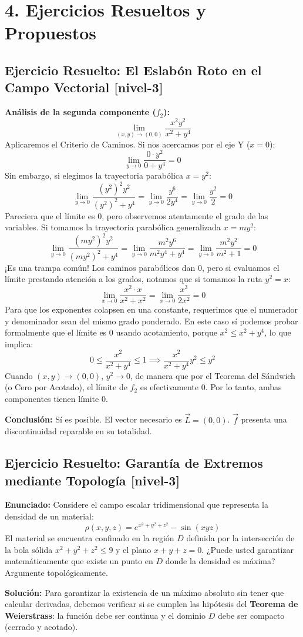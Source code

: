 \documentclass[11pt]{article}
\newenvironment{ejercicios}{%
  \section*{4. Ejercicios Resueltos y Propuestos}%
}{}
\newenvironment{ejercicioresuelto}[2]{\subsection*{Ejercicio Resuelto: #1 \small{[#2]}}}{}
\newcommand{\enunciado}[1]{\textbf{Enunciado:} #1\par\vspace{0.2cm}}
\newcommand{\solucion}[1]{\textbf{Solución:} #1\par\vspace{0.4cm}}
\begin{document}
\begin{ejercicios}
\begin{ejercicioresuelto}{El Eslabón Roto en el Campo Vectorial}{nivel-3}
{      \textbf{Análisis de la segunda componente ($f_2$):}
      $$ \displaystyle \lim\limits_{(x,y) \to (0,0)} \displaystyle \dfrac{x^2 y^2}{x^2 + y^4} $$
      Aplicaremos el Criterio de Caminos. 
      Si nos acercamos por el eje Y ($x = 0$):
      $$ \displaystyle \lim\limits_{y \to 0} \displaystyle \dfrac{0 \cdot y^2}{0 + y^4} = 0 $$
      Sin embargo, si elegimos la trayectoria parabólica $x = y^2$:
      $$ \displaystyle \lim\limits_{y \to 0} \displaystyle \dfrac{(y^2)^2 y^2}{(y^2)^2 + y^4} = \displaystyle \lim\limits_{y \to 0} \displaystyle \dfrac{y^6}{2y^4} = \displaystyle \lim\limits_{y \to 0} \displaystyle \dfrac{y^2}{2} = 0 $$
      Pareciera que el límite es $0$, pero observemos atentamente el grado de las variables. Si tomamos la trayectoria parabólica generalizada $x = m y^2$: 
      $$ \displaystyle \lim\limits_{y \to 0} \displaystyle \dfrac{(m y^2)^2 y^2}{(m y^2)^2 + y^4} = \displaystyle \lim\limits_{y \to 0} \displaystyle \dfrac{m^2 y^6}{m^2 y^4 + y^4} = \displaystyle \lim\limits_{y \to 0} \displaystyle \dfrac{m^2 y^2}{m^2 + 1} = 0 $$
      ¡Es una trampa común! Los caminos parabólicos dan 0, pero si evaluamos el límite prestando atención a los grados, notamos que si tomamos la ruta $y^2 = x$:
      $$ \displaystyle \lim\limits_{x \to 0} \displaystyle \dfrac{x^2 \cdot x}{x^2 + x^2} = \displaystyle \lim\limits_{x \to 0} \displaystyle \dfrac{x^3}{2x^2} = 0 $$
      Para que los exponentes colapsen en una constante, requerimos que el numerador y denominador sean del mismo grado ponderado. En este caso sí podemos probar formalmente que el límite es $0$ usando acotamiento, porque $x^2 \le x^2+y^4$, lo que implica:
      $$ 0 \le \displaystyle \dfrac{x^2}{x^2+y^4} \le 1 \implies \displaystyle \dfrac{x^2}{x^2+y^4} y^2 \le y^2 $$
      Cuando $(x,y) \to (0,0)$, $y^2 \to 0$, de manera que por el Teorema del Sándwich (o Cero por Acotado), el límite de $f_2$ es efectivamente $0$.
      Por lo tanto, ambas componentes tienen límite $0$. 
      
      \textbf{Conclusión:}
      Sí es posible. El vector necesario es $\vec{L} = (0,0)$. $\vec{f}$ presenta una discontinuidad reparable en su totalidad.
    }
  \end{ejercicioresuelto}

  \begin{ejercicioresuelto}{Garantía de Extremos mediante Topología}{nivel-3}
    \enunciado{
      Considere el campo escalar tridimensional que representa la densidad de un material:
      $$ \rho(x,y,z) = e^{x^2+y^2+z^2} - \sin(xyz) $$
      El material se encuentra confinado en la región $D$ definida por la intersección de la bola sólida $x^2+y^2+z^2 \le 9$ y el plano $x+y+z = 0$. 
      ¿Puede usted garantizar matemáticamente que existe un punto en $D$ donde la densidad es máxima? Argumente topológicamente.
    }
    \solucion{
      Para garantizar la existencia de un máximo absoluto sin tener que calcular derivadas, debemos verificar si se cumplen las hipótesis del \textbf{Teorema de Weierstrass}: la función debe ser continua y el dominio $D$ debe ser compacto (cerrado y acotado).

}
\end{ejercicioresuelto}
\end{ejercicios}
\end{document}
